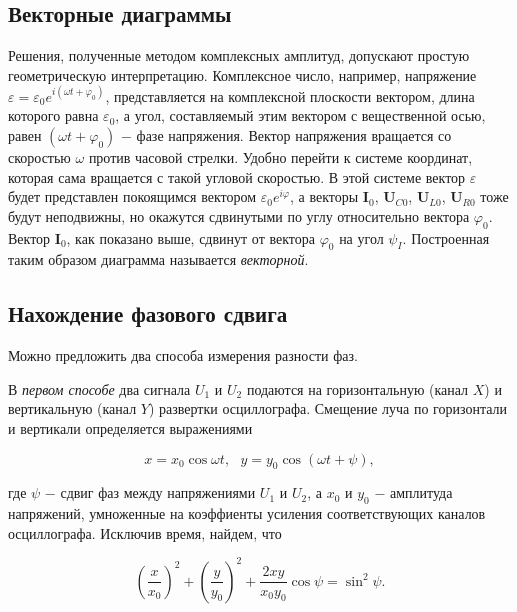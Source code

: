 \documentclass[a4paper,12pt]{article} %
\begin{document}
\subsection{Векторные диаграммы}
\hfill \break Решения, полученные методом комплексных амплитуд, допускают простую геометрическую интерпретацию. Комплексное число, например, напряжение $\varepsilon =\varepsilon_{0}e^{i(\omega t + \varphi_{0})}$, представляется на комплексной плоскости вектором, длина которого равна $\varepsilon_{0}$, а угол, составляемый этим вектором с  вещественной осью, равен $(\omega t + \varphi_{0})$ $-$ фазе напряжения. Вектор напряжения вращается со скоростью $\omega$ против часовой стрелки. Удобно перейти к системе координат, которая сама вращается с такой угловой скоростью. В этой системе вектор $\varepsilon$ будет представлен покоящимся вектором $\varepsilon_{0}e^{i \varphi}$, а векторы $\textbf{I}_{0}$, $\textbf{U}_{C0}$, $\textbf{U}_{L0}$, $\textbf{U}_{R0}$ тоже будут неподвижны, но окажутся сдвинутыми по углу относительно вектора $\varphi_{0}$. Вектор $\textbf{I}_{0}$, как показано выше, сдвинут от вектора $\varphi_{0}$ на угол $\psi_{I}$. Построенная таким образом диаграмма называется \textit{векторной}.

\subsection{Нахождение фазового сдвига}
\hfill \break Можно предложить два способа измерения разности фаз.

\hfill \break В \textit{первом способе} два сигнала $U_{1}$ и $U_{2}$ подаются на горизонтальную (канал $X$) и вертикальную (канал $Y$) развертки осциллографа. Смещение луча по горизонтали и вертикали определяется выражениями

$$
x = x_{0}\cos{\omega t}, \text{ } y = y_{0} \cos{(\omega t + \psi),}
$$

\hfill \break где $\psi$ $-$ сдвиг фаз между напряжениями $U_{1}$ и $U_{2}$, а $x_{0}$ и $y_{0}$ $-$ амплитуда напряжений, умноженные на коэффиенты усиления соответствующих каналов осциллографа. Исключив время, найдем, что

$$
\left(\frac{x}{x_{0}}\right)^2 + \left(\frac{y}{y_{0}}\right)^2 + \frac{2xy}{x_{0}y_{0}}\cos{\psi} = \sin^2{\psi}.
$$
\end{document}
